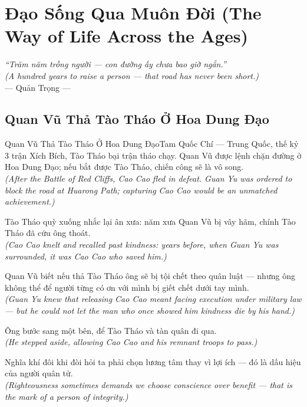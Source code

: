 \chapter{Đạo Sống Qua Muôn Đời (The Way of Life Across the Ages)}
\begin{center}
  \textit{\color{truyengold}``Trăm năm trồng người --- con đường ấy chưa bao giờ ngắn.''}\\[4pt]
  \textit{(A hundred years to raise a person --- that road has never been short.)}\\[4pt]
  \small\color{truyenblue}--- Quản Trọng ---
\end{center}
\ngancach

\section{Quan Vũ Thả Tào Tháo Ở Hoa Dung Đạo}
\begin{truyen}{Quan Vũ Thả Tào Tháo Ở Hoa Dung Đạo}{Tam Quốc Chí --- Trung Quốc, thế kỷ 3}
 trận Xích Bích, Tào Tháo bại trận tháo chạy. Quan Vũ được lệnh chặn đường ở Hoa Dung Đạo; nếu bắt được Tào Tháo, chiến công sẽ là vô song.\\[4pt]
\textit{(After the Battle of Red Cliffs, Cao Cao fled in defeat. Guan Yu was ordered to block the road at Huarong Path; capturing Cao Cao would be an unmatched achievement.)}

Tào Tháo quỳ xuống nhắc lại ân xưa: năm xưa Quan Vũ bị vây hãm, chính Tào Tháo đã cứu ông thoát.\\[4pt]
\textit{(Cao Cao knelt and recalled past kindness: years before, when Guan Yu was surrounded, it was Cao Cao who saved him.)}

Quan Vũ biết nếu thả Tào Tháo ông sẽ bị tội chết theo quân luật --- nhưng ông không thể để người từng có ơn với mình bị giết chết dưới tay mình.\\[4pt]
\textit{(Guan Yu knew that releasing Cao Cao meant facing execution under military law --- but he could not let the man who once showed him kindness die by his hand.)}

Ông bước sang một bên, để Tào Tháo và tàn quân đi qua.\\[4pt]
\textit{(He stepped aside, allowing Cao Cao and his remnant troops to pass.)}

\end{truyen}
\begin{baihoc}
  Nghĩa khí đôi khi đòi hỏi ta phải chọn lương tâm thay vì lợi ích --- đó là dấu hiệu của người quân tử.\\[4pt]
  \textit{(Righteousness sometimes demands we choose conscience over benefit --- that is the mark of a person of integrity.)}
\end{baihoc}

